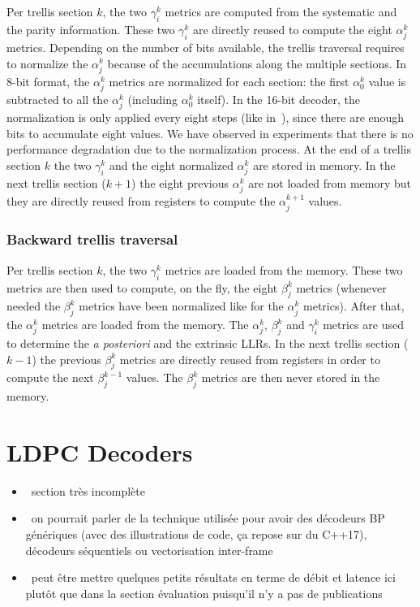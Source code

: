 Per trellis section $k$, the two $\gamma_i^k$ metrics are computed from the
systematic and the parity information. These two $\gamma_i^k$ are directly
reused to compute the eight $\alpha_j^k$ metrics. Depending on the number of
bits available, the trellis traversal requires to normalize the $\alpha_j^k$
because of the accumulations along the multiple sections.  In 8-bit format, the
$\alpha_j^k$ metrics are normalized for each section: the first $\alpha_0^k$
value is subtracted to all the $\alpha_j^k$ (including $\alpha_0^k$ itself). In
the 16-bit decoder, the normalization is only applied every eight steps (like
in~\cite{Wu2013}), since there are enough bits to accumulate eight values. We
have observed in experiments that there is no performance degradation due to the
normalization process. At the end of a trellis section $k$ the two $\gamma_i^k$
and the eight normalized $\alpha_j^k$ are stored in  memory. In the next trellis
section ($k+1$) the eight previous $\alpha_j^k$ are not loaded from memory but
they are directly reused from registers to compute the $\alpha_j^{k+1}$ values.

\subsubsection{Backward trellis traversal}

Per trellis section $k$, the two $\gamma_i^k$ metrics are loaded from the
memory. These two metrics are then used to compute, on the fly, the eight
$\beta_j^k$ metrics (whenever needed the $\beta_j^k$ metrics have been
normalized like for the $\alpha_j^k$ metrics). After that, the $\alpha_j^k$
metrics are loaded from the memory. The $\alpha_j^k$, $\beta_j^k$ and
$\gamma_i^k$ metrics are used to determine the \textit{a posteriori} and the
extrinsic LLRs. In the next trellis section ($k-1$) the previous $\beta_j^k$
metrics are directly reused from registers in order to compute the next
$\beta_j^{k-1}$ values. The $\beta_j^k$ metrics are then never stored in the
memory.

\section{LDPC Decoders}

\begin{itemize}
  \item \xmark~section très incomplète
  \item \xmark~on pourrait parler de la technique utilisée pour avoir des
    décodeurs BP génériques (avec des illustrations de code, ça repose sur du
    C++17), décodeurs séquentiels ou vectorisation inter-frame
  \item \xmark~peut être mettre quelques petits résultats en terme de débit et
    latence ici plutôt que dans la section évaluation puisqu'il n'y a pas de
    publications
\end{itemize}

